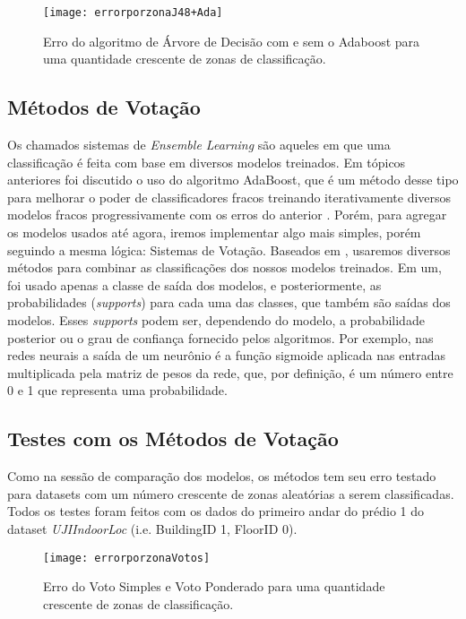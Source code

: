 \begin{figure}[H]
	\centering
	\caption{Erro do algoritmo de Árvore de Decisão com e sem o Adaboost  para uma quantidade crescente de zonas de classificação.}
  \texttt{[image: errorporzonaJ48+Ada]}
\label{fig:zonaAda}

\end{figure}

\subsection{Métodos de Votação}

Os chamados sistemas de \textit{Ensemble Learning} são aqueles em que uma classificação é feita com base em diversos modelos treinados. Em tópicos anteriores foi discutido o uso do algoritmo AdaBoost, que é um método desse tipo para melhorar o poder de classificadores fracos treinando iterativamente diversos modelos fracos progressivamente com os erros do anterior \cite {explainingadaboost}. Porém, para agregar os modelos usados até agora, iremos implementar algo mais simples, porém seguindo a mesma lógica: Sistemas de Votação. Baseados em \cite{Nagi2013}, usaremos diversos métodos para combinar as classificações dos nossos modelos treinados. Em um, foi usado apenas a classe de saída dos modelos, e posteriormente, as probabilidades (\textit{supports}) para cada uma das classes, que também são saídas dos modelos. Esses \textit{supports} podem ser, dependendo do modelo, a probabilidade posterior ou o grau de confiança fornecido pelos algoritmos. Por exemplo, nas redes neurais a saída de um neurônio é a função sigmoide aplicada nas entradas multiplicada pela matriz de pesos da rede, que, por definição, é um número entre 0 e 1 que representa uma probabilidade.




\subsection{Testes com os Métodos de Votação}

Como na sessão de comparação dos modelos, os métodos tem seu erro testado para datasets com um número crescente de zonas aleatórias a serem classificadas. Todos os testes foram feitos com os dados do primeiro andar do prédio 1 do dataset \textit{UJIIndoorLoc} (i.e. BuildingID 1, FloorID 0).




\begin{figure}[!ht]
	\centering
	\caption{Erro do Voto Simples e Voto Ponderado para uma quantidade crescente de zonas de classificação.}
  \texttt{[image: errorporzonaVotos]}
\label{fig:zonaVotos}

\end{figure}


